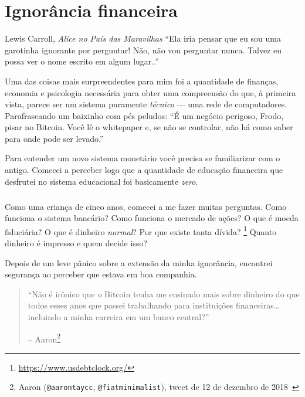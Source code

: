 \chapter{Ignorância financeira}
\label{les:8}

\begin{chapquote}{Lewis Carroll, \textit{Alice no País das Maravilhas}}
\enquote{Ela iria pensar que eu sou uma garotinha ignorante por perguntar! Não, não vou perguntar nunca. Talvez eu possa ver o nome escrito em algum lugar..}
\end{chapquote}

Uma das coisas mais surpreendentes para mim foi a quantidade de finanças, economia e psicologia necessária para obter uma compreensão do que, à primeira vista, parece ser um sistema puramente \textit{técnico} --- uma rede de computadores. Parafraseando um baixinho com pés peludos: \enquote{É um negócio perigoso, Frodo, pisar no Bitcoin. Você lê o whitepaper e, se não se controlar, não há como saber para onde pode ser levado.}

Para entender um novo sistema monetário você precisa se familiarizar com o antigo. Comecei a perceber logo que a quantidade de educação financeira que desfrutei no sistema educacional foi basicamente \textit{zero}.

\paragraph{}
Como uma criança de cinco anos, comecei a me fazer muitas perguntas. Como funciona o sistema bancário? Como funciona o mercado de ações? O que é moeda fiduciária? O que é dinheiro \textit{normal}? Por que existe tanta dívida? \footnote{\url{https://www.usdebtclock.org/}} Quanto dinheiro é impresso e quem decide isso?

\newpage

Depois de um leve pânico sobre a extensão da minha ignorância, encontrei segurança ao perceber que estava em boa companhia.

\begin{quotation}\begin{samepage}
\enquote{Não é irônico que o Bitcoin tenha me ensinado mais sobre dinheiro do que todos esses anos que passei trabalhando para instituições financeiras\ldots incluindo a minha carreira em um banco central?}
\begin{flushright} -- Aaron\footnote{Aaron (\texttt{@aarontaycc}, \texttt{@fiatminimalist}), tweet de 12 de dezembro de 2018~\cite{aarontaycc-tweet}}
\end{flushright}\end{samepage}\end{quotation}

